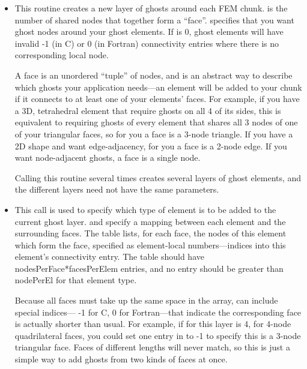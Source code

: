 \begin{itemize}
\item

This routine creates a new layer of ghosts around each FEM chunk.  is the number of shared nodes that together form a ``face''.  specifies that you want ghost nodes around your ghost elements.  If  is 0, ghost elements will have invalid -1 (in C) or 0 (in Fortran) connectivity entries where there is no corresponding local node.

A face is an unordered ``tuple'' of nodes, and is an abstract way to describe which ghosts
your application needs---an element will be added to your chunk if it connects to at 
least one of your elements' faces.  For example, if you have a 3D, tetrahedral element that require ghosts 
on all 4 of its sides, this is equivalent to requiring ghosts of every element that shares all 3
nodes of one of your triangular faces, so for you a face is a 3-node triangle.  If you have a 2D shape
and want edge-adjacency, for you a face is a 2-node edge.  If you want node-adjacent ghosts,
a face is a single node.

Calling this routine several times creates several layers of ghost elements, and the different layers need not have the same parameters.

\item
{}

This call is used to specify which type of element is to be added to the current ghost layer.  and  specify a mapping between each element and the surrounding faces.  The  table lists, for each face, the nodes of this element which form the face, specified as element-local numbers---indices into this element's connectivity entry. The  table should have nodesPerFace*facesPerElem entries, and no entry should be greater than nodePerEl for that element type.

Because all faces must take up the same space in the array,
 can include special indices--- -1 for C, 0 for Fortran---that indicate the
corresponding face is actually shorter than usual.  For example, if  for this layer
is 4, for 4-node quadrilateral faces, you could set one entry in  to -1 to specify
this is a 3-node triangular face.  Faces of different lengths will never match, so this is just
a simple way to add ghosts from two kinds of faces at once.

\end{itemize}

